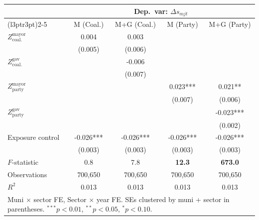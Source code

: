 \begin{tabular}[t]{lcccc}
\toprule
\multicolumn{1}{c}{\textbf{ }} & \multicolumn{4}{c}{\textbf{Dep.~var: $\Delta s_{mjt}$}} \\
\cmidrule(l{3pt}r{3pt}){2-5}
  & M (Coal.) & M+G (Coal.) & M (Party) & M+G (Party)\\
\midrule
$Z^{\text{mayor}}_{\text{coal.}}$ & 0.004 & 0.003 &  & \\
 & (0.005) & (0.006) &  & \\
$Z^{\text{gov}}_{\text{coal.}}$ &  & -0.006 &  & \\
 &  & (0.007) &  & \\
$Z^{\text{mayor}}_{\text{party}}$ &  &  & 0.023*** & 0.021**\\
 &  &  & (0.007) & (0.006)\\
$Z^{\text{gov}}_{\text{party}}$ &  &  &  & -0.023***\\
 &  &  &  & (0.002)\\
Exposure control & -0.026*** & -0.026*** & -0.026*** & -0.026***\\
 & (0.003) & (0.003) & (0.003) & (0.003)\\
\midrule
$F$-statistic & 0.8 & 7.8 & \textbf{12.3} & \textbf{673.0}\\
Observations & 700,650 & 700,650 & 700,650 & 700,650\\
$R^2$ & 0.013 & 0.013 & 0.013 & 0.013\\
\bottomrule
\multicolumn{5}{l}{\rule{0pt}{1em}Muni $\times$ sector FE, Sector $\times$ year FE. SEs clustered by muni + sector in parentheses. $^{***}p<0.01$, $^{**}p<0.05$, $^{*}p<0.10$.}\\
\end{tabular}
